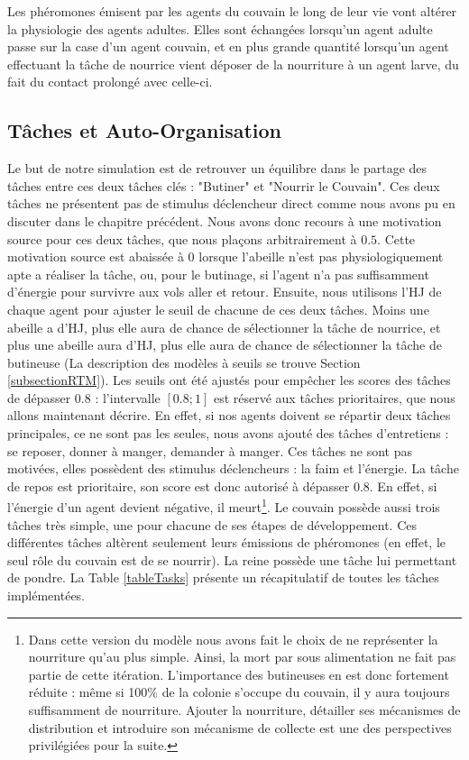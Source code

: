 			Les phéromones émisent par les agents du couvain le long de leur vie vont altérer la physiologie des agents adultes. Elles sont échangées lorsqu'un agent adulte passe sur la case d'un agent couvain, et en plus grande quantité lorsqu'un agent effectuant la tâche de nourrice vient déposer de la nourriture à un agent larve, du fait du contact prolongé avec celle-ci.
		
	\subsection{Tâches et Auto-Organisation}
		Le but de notre simulation est de retrouver un équilibre dans le partage des tâches entre ces deux tâches clés : "Butiner" et "Nourrir le Couvain". Ces deux tâches ne présentent pas de stimulus déclencheur direct comme nous avons pu en discuter dans le chapitre précédent. Nous avons donc recours à une motivation source pour ces deux tâches, que nous plaçons arbitrairement à $0.5$. Cette motivation source est abaissée à 0 lorsque l'abeille n'est pas physiologiquement apte a réaliser la tâche, ou, pour le butinage, si l'agent n'a pas suffisamment d'énergie pour survivre aux vols aller et retour. Ensuite, nous utilisons l'HJ de chaque agent pour ajuster le seuil de chacune de ces deux tâches. Moins une abeille a d'HJ, plus elle aura de chance de sélectionner la tâche de nourrice, et plus une abeille aura d'HJ, plus elle aura de chance de sélectionner la tâche de butineuse (La description des modèles à seuils se trouve Section \ref{subsectionRTM}). Les seuils ont été ajustés pour empêcher les scores des tâches de dépasser $0.8$ : l'intervalle $[0.8 ; 1]$ est réservé aux tâches prioritaires, que nous allons maintenant décrire. En effet, si nos agents doivent se répartir deux tâches principales, ce ne sont pas les seules, nous avons ajouté des tâches d'entretiens : se reposer, donner à manger, demander à manger. Ces tâches ne sont pas motivées, elles possèdent des stimulus déclencheurs : la faim et l'énergie. La tâche de repos est prioritaire, son score est donc autorisé à dépasser $0.8$. En effet, si l'énergie d'un agent devient négative, il meurt\footnote{Dans cette version du modèle nous avons fait le choix de ne représenter la nourriture qu'au plus simple. Ainsi, la mort par sous alimentation ne fait pas partie de cette itération. L'importance des butineuses en est donc fortement réduite : même si 100\% de la colonie s'occupe du couvain, il y aura toujours suffisamment de nourriture. Ajouter la nourriture, détailler ses mécanismes de distribution et introduire son mécanisme de collecte est une des perspectives privilégiées pour la suite.}. Le couvain possède aussi trois tâches très simple, une pour chacune de ses étapes de développement. Ces différentes tâches altèrent seulement leurs émissions de phéromones (en effet, le seul rôle du couvain est de se nourrir). La reine possède une tâche lui permettant de pondre. La Table \ref{tableTasks} présente un récapitulatif de toutes les tâches implémentées.
		

